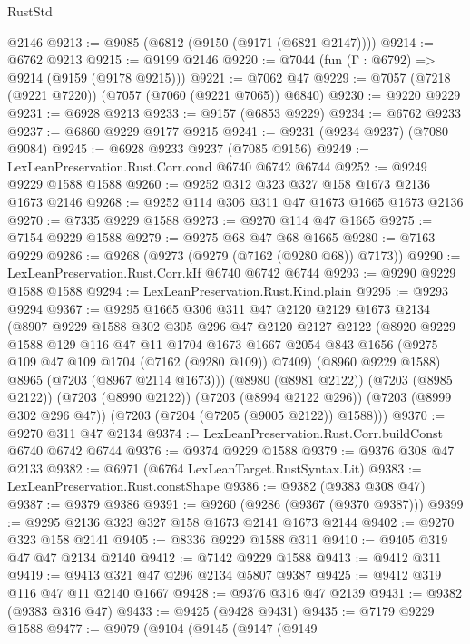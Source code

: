 \begin{lexlean}{RustStd}
\begin{coremodule}
    @2146
@9213 := @9085 (@6812 (@9150 (@9171 (@6821 @2147))))
@9214 := @6762 @9213
@9215 := @9199 @2146
@9220 := @7044 (fun (Γ : @6792) => @9214 (@9159 (@9178 @9215)))
@9221 := @7062 @47
@9229 := @7057 (@7218 (@9221 @7220)) (@7057 (@7060 (@9221 @7065)) @6840)
@9230 := @9220 @9229
@9231 := @6928 @9213
@9233 := @9157 (@6853 @9229)
@9234 := @6762 @9233
@9237 := @6860 @9229 @9177 @9215
@9241 := @9231 (@9234 @9237) (@7080 @9084)
@9245 := @6928 @9233 @9237 (@7085 @9156)
@9249 := LexLeanPreservation.Rust.Corr.cond @6740 @6742 @6744
@9252 := @9249 @9229 @1588 @1588
@9260 := @9252 @312 @323 @327 @158 @1673 @2136 @1673 @2146
@9268 := @9252 @114 @306 @311 @47 @1673 @1665 @1673 @2136
@9270 := @7335 @9229 @1588
@9273 := @9270 @114 @47 @1665
@9275 := @7154 @9229 @1588
@9279 := @9275 @68 @47 @68 @1665
@9280 := @7163 @9229
@9286 := @9268 (@9273 (@9279 (@7162 (@9280 @68)) @7173))
@9290 := LexLeanPreservation.Rust.Corr.kIf @6740 @6742 @6744
@9293 := @9290 @9229 @1588 @1588
@9294 := LexLeanPreservation.Rust.Kind.plain
@9295 := @9293 @9294
@9367 := @9295
    @1665
    @306
    @311
    @47
    @2120
    @2129
    @1673
    @2134
    (@8907
      @9229
      @1588
      @302
      @305
      @296
      @47
      @2120
      @2127
      @2122
      (@8920
        @9229
        @1588
        @129
        @116
        @47
        @11
        @1704
        @1673
        @1667
        @2054
        @843
        @1656
        (@9275 @109 @47 @109 @1704 (@7162 (@9280 @109)) @7409)
        (@8960 @9229 @1588)
        @8965
        (@7203 (@8967 @2114 @1673)))
      (@8980 (@8981 @2122))
      (@7203 (@8985 @2122))
      (@7203 (@8990 @2122))
      (@7203 (@8994 @2122 @296))
      (@7203 (@8999 @302 @296 @47))
      (@7203 (@7204 (@7205 (@9005 @2122)) @1588)))
@9370 := @9270 @311 @47 @2134
@9374 := LexLeanPreservation.Rust.Corr.buildConst @6740 @6742 @6744
@9376 := @9374 @9229 @1588
@9379 := @9376 @308 @47 @2133
@9382 := @6971 (@6764 LexLeanTarget.RustSyntax.Lit)
@9383 := LexLeanPreservation.Rust.constShape
@9386 := @9382 (@9383 @308 @47)
@9387 := @9379 @9386
@9391 := @9260 (@9286 (@9367 (@9370 @9387)))
@9399 := @9295 @2136 @323 @327 @158 @1673 @2141 @1673 @2144
@9402 := @9270 @323 @158 @2141
@9405 := @8336 @9229 @1588 @311
@9410 := @9405 @319 @47 @47 @2134 @2140
@9412 := @7142 @9229 @1588
@9413 := @9412 @311
@9419 := @9413 @321 @47 @296 @2134 @5807 @9387
@9425 := @9412 @319 @116 @47 @11 @2140 @1667
@9428 := @9376 @316 @47 @2139
@9431 := @9382 (@9383 @316 @47)
@9433 := @9425 (@9428 @9431)
@9435 := @7179 @9229 @1588
@9477 := @9079
    (@9104
      (@9145
        (@9147
          (@9149

\end{coremodule}
\end{lexlean}

